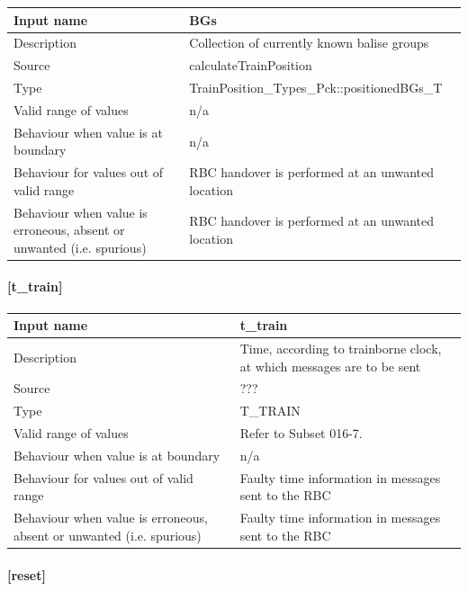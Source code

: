 \begin{longtable}{p{}p{}}
	\toprule
	Input name				& BGs \\
	\midrule
	Description				& Collection of currently known balise groups \\
	\midrule
	Source					& calculateTrainPosition \\ 
	\midrule
	Type					& TrainPosition\_Types\_Pck::positionedBGs\_T \\
	\midrule
	Valid range of values	& n/a \\
	\midrule
	Behaviour when value is at boundary	& n/a \\
	\midrule
	Behaviour for values out of valid range	& RBC handover is performed at an unwanted location \\
	\midrule
	Behaviour when value is erroneous, absent or unwanted (i.e. spurious) & RBC handover is performed at an unwanted location \\
	\bottomrule
\end{longtable}

\paragraph{[t\_train]}

\begin{longtable}{p{}p{}}
	\toprule
	Input name				& t\_train \\
	\midrule
	Description				& Time, according to trainborne clock, at which messages are to be sent \\
	\midrule
	Source					& ??? \\ 
	\midrule
	Type					& T\_TRAIN \\
	\midrule
	Valid range of values	& Refer to Subset 016-7. \\
	\midrule
	Behaviour when value is at boundary	& n/a \\
	\midrule
	Behaviour for values out of valid range	& Faulty time information in messages sent to the RBC \\
	\midrule
	Behaviour when value is erroneous, absent or unwanted (i.e. spurious) & Faulty time information in messages sent to the RBC \\
	\bottomrule
\end{longtable}

\paragraph{[reset]}

